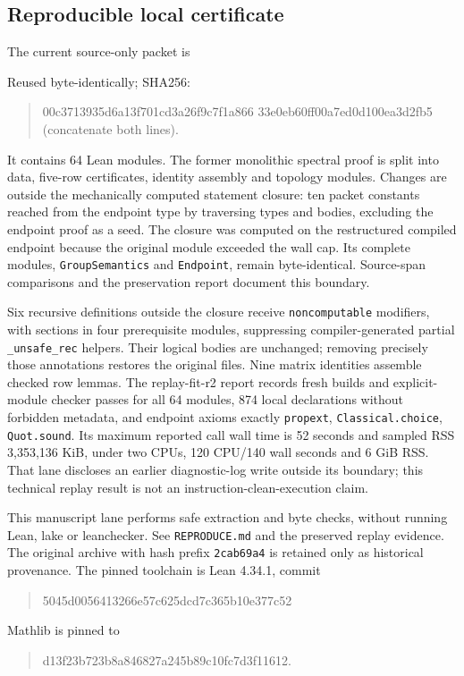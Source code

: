 \documentclass[11pt]{article}
\begin{document}
\subsection*{Reproducible local certificate}
The current source-only packet is
\begin{quote}\small{}\end{quote}
Reused byte-identically; SHA256:
\begin{quote}\small\ttfamily
00c3713935d6a13f701cd3a26f9c7f1a866\newline
33e0eb60ff00a7ed0d100ea3d2fb5 (concatenate both lines).
\end{quote}
It contains 64 Lean modules. The former monolithic spectral proof is split into data, five-row certificates, identity assembly and topology modules. Changes are outside the mechanically computed statement closure: ten packet constants reached from the endpoint type by traversing types and bodies, excluding the endpoint proof as a seed. The closure was computed on the restructured compiled endpoint because the original module exceeded the wall cap. Its complete modules, \texttt{GroupSemantics} and \texttt{Endpoint}, remain byte-identical. Source-span comparisons and the preservation report document this boundary.

Six recursive definitions outside the closure receive \texttt{noncomputable} modifiers, with sections in four prerequisite modules, suppressing compiler-generated partial \texttt{\_unsafe\_rec} helpers. Their logical bodies are unchanged; removing precisely those annotations restores the original files. Nine matrix identities assemble checked row lemmas. The replay-fit-r2 report records fresh builds and explicit-module checker passes for all 64 modules, 874 local declarations without forbidden metadata, and endpoint axioms exactly \texttt{propext}, \texttt{Classical.choice}, \texttt{Quot.sound}. Its maximum reported call wall time is 52 seconds and sampled RSS 3,353,136 KiB, under two CPUs, 120 CPU/140 wall seconds and 6 GiB RSS. That lane discloses an earlier diagnostic-log write outside its boundary; this technical replay result is not an instruction-clean-execution claim.

\newpage
This manuscript lane performs safe extraction and byte checks, without running Lean, lake or leanchecker. See \texttt{REPRODUCE.md} and the preserved replay evidence. The original archive with hash prefix \texttt{2cab69a4} is retained only as historical provenance. The pinned toolchain is Lean 4.34.1, commit
\begin{quote}\small\ttfamily 5045d0056413266e57c625dcd7c365b10e377c52\end{quote}
Mathlib is pinned to
\begin{quote}\small\ttfamily d13f23b723b8a846827a245b89c10fc7d3f11612.\end{quote}
\end{document}
